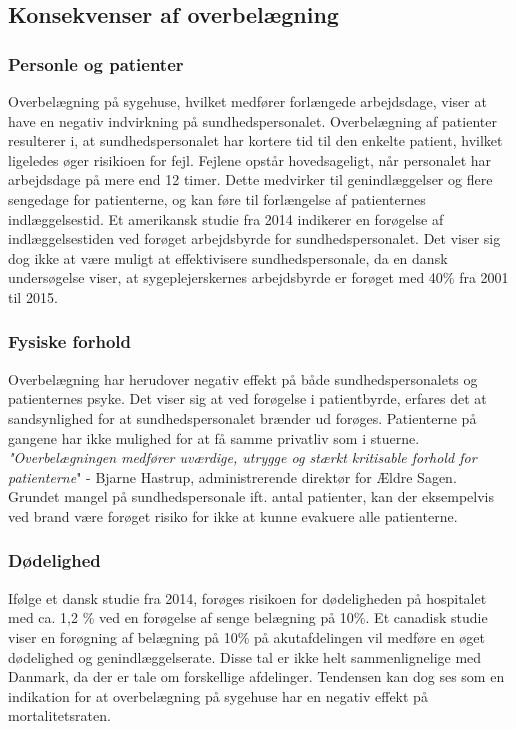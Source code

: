 \subsection{Konsekvenser af overbelægning}


\subsubsection{Personle og patienter}
Overbelægning på sygehuse, hvilket medfører forlængede arbejdsdage, viser at have en negativ indvirkning på sundhedspersonalet. \citep{Kjeldsen2015} \citep{Dinges2004} Overbelægning af patienter resulterer i, at sundhedspersonalet har kortere tid til den enkelte patient, hvilket ligeledes øger risikioen for fejl. Fejlene opstår hovedsageligt, når personalet har arbejdsdage på mere end 12 timer. \citep{Dinges2004} Dette medvirker til genindlæggelser og flere sengedage for patienterne, og kan føre til forlængelse af patienternes indlæggelsestid. Et amerikansk studie fra 2014 indikerer en forøgelse af indlæggelsestiden ved forøget arbejdsbyrde for sundhedspersonalet\citep{Elliott2014}. Det viser sig dog ikke at være muligt at effektivisere sundhedspersonale, da en dansk undersøgelse viser, at sygeplejerskernes arbejdsbyrde er forøget med 40\% fra 2001 til 2015.\citep{Kjeldsen2015}  

\subsubsection{Fysiske forhold}

Overbelægning har herudover negativ effekt på både sundhedspersonalets og patienternes psyke. Det viser sig at ved forøgelse i patientbyrde, erfares det at sandsynlighed for at sundhedspersonalet brænder ud forøges. \citep{Aiken2002} 
Patienterne på gangene har ikke mulighed for at få samme privatliv som i stuerne.\citep{Madsen2014} \textit{"Overbelægningen medfører uværdige, utrygge og stærkt kritisable forhold for patienterne}" - Bjarne Hastrup, administrerende direktør for Ældre Sagen. \citep{Politiken2013}
Grundet mangel på sundhedspersonale ift. antal patienter, kan der eksempelvis ved brand være forøget risiko for ikke at kunne evakuere alle patienterne. \citep{Madsen2014}

\subsubsection{Dødelighed}
Ifølge et dansk studie fra 2014, forøges risikoen for dødeligheden på hospitalet med ca. 1,2 \% ved en forøgelse af senge belægning på 10\%. \citep{Madsen2014} Et canadisk studie viser en forøgning af belægning på 10\% på akutafdelingen vil medføre en øget dødelighed og genindlæggelserate.\citep{McCusker2014} Disse tal er ikke helt sammenlignelige med Danmark, da der er tale om forskellige afdelinger. Tendensen kan dog ses som en indikation for at overbelægning på sygehuse har en negativ effekt på mortalitetsraten.